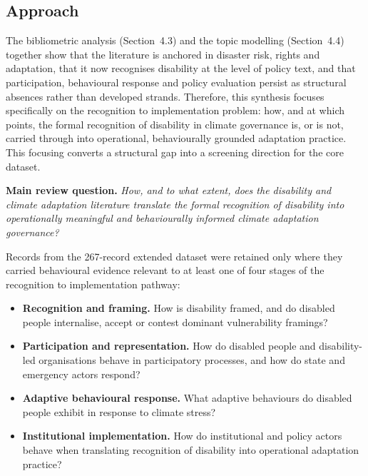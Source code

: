 \documentclass[12pt,a4paper]{report}
\begin{document}
\subsection{Approach}
\label{sec:4-5-1-approach}
The bibliometric analysis (Section~4.3) and the topic modelling (Section~4.4) together show that the literature is anchored in disaster risk, rights and adaptation, that it now recognises disability at the level of policy text, and that participation, behavioural response and policy evaluation persist as structural absences rather than developed strands. Therefore, this synthesis focuses specifically on the recognition to implementation problem: how, and at which points, the formal recognition of disability in climate governance is, or is not, carried through into operational, behaviourally grounded adaptation practice. This focusing converts a structural gap into a screening direction for the core dataset.

\textbf{Main review question.} \emph{How, and to what extent, does the disability and climate adaptation literature translate the formal recognition of disability into operationally meaningful and behaviourally informed climate adaptation governance?}

Records from the 267-record extended dataset were retained only where they carried behavioural evidence relevant to at least one of four stages of the recognition to implementation pathway:

\begin{itemize}
    \item \textbf{Recognition and framing.} How is disability framed, and do disabled people internalise, accept or contest dominant vulnerability framings?
    \item \textbf{Participation and representation.} How do disabled people and disability-led organisations behave in participatory processes, and how do state and emergency actors respond?
    \item \textbf{Adaptive behavioural response.} What adaptive behaviours do disabled people exhibit in response to climate stress?
    \item \textbf{Institutional implementation.} How do institutional and policy actors behave when translating recognition of disability into operational adaptation practice?
\end{itemize}
\end{document}
